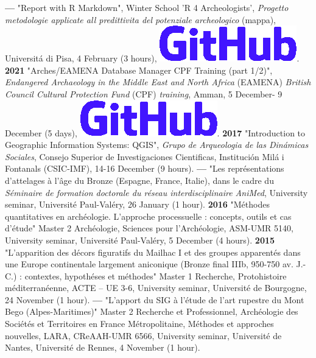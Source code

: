 \documentclass{article}
\begin{document}
\smallbreak
\textbf{--- }"Report with R Markdown", Winter School 'R 4 Archeologists', \textit{Progetto metodologie applicate all predittivita del potenziale archeologico} (mappa), Universit\'{a} di Pisa, 4 February (3 hours), \href{https://github.com/zoometh/thomashuet/tree/main/profiles/oxford/R4A#readme}{\includegraphics[scale=0.12]{github-rect.png}}.
\smallbreak
\textbf{2021 }"Arches/EAMENA Database Manager CPF Training (part 1/2)", \textit{Endangered Archaeology in the Middle East and North Africa} (EAMENA) \textit{British Council Cultural Protection Fund} (CPF) \textit{training}, Amman, 5 December- 9 December (5 days), \href{https://github.com/eamena-oxford/eamena-arches-dev/tree/main/training#readme}{\includegraphics[scale=0.12]{github-rect.png}}.
\smallbreak 
\textbf{2017 }"Introduction to Geographic Information Systems: QGIS", \textit{Grupo de Arqueologia de las Din\'{a}micas Sociales}, Consejo Superior de Investigaciones Cientificas, Instituci\'{o}n Mil\'{a} i Fontanals (CSIC-IMF), 14-16 December (9 hours).
\smallbreak
\textbf{--- }"Les repr\'{e}sentations d'attelages \`{a} l'\^{a}ge du Bronze (Espagne, France, Italie), dans le cadre du \textit{S\'{e}minaire de formation doctorale du r\'{e}seau interdisciplinaire AniMed}, University seminar, Universit\'{e} Paul-Val\'{e}ry, 26 January (1 hour).
\smallbreak
\textbf{2016 }"M\'{e}thodes quantitatives en arch\'{e}ologie. L'approche processuelle : concepts, outils et cas d'\'{e}tude" Master 2 Arch\'{e}ologie, Sciences pour l'Arch\'{e}ologie, ASM-UMR 5140, University seminar, Universit\'{e} Paul-Val\'{e}ry, 5 December (4 hours).
\smallbreak
\textbf{2015 }"L'apparition des d\'{e}cors figuratifs du Mailhac I et des groupes apparent\'{e}s dans une Europe continentale largement aniconique (Bronze final IIIb, 950-750 av. J.-C.) : contextes, hypoth\'{e}ses et m\'{e}thodes" Master 1 Recherche, Protohistoire m\'{e}diterran\'{e}enne, ACTE -- UE 3-6, University seminar, Universit\'{e} de Bourgogne, 24 November (1 hour).
\smallbreak
\textbf{--- }"L'apport du SIG \`{a} l'\'{e}tude de l'art rupestre du Mont Bego (Alpes-Maritimes)" Master 2 Recherche et Professionnel, Arch\'{e}ologie des Soci\'{e}t\'{e}s et Territoires en France M\'{e}tropolitaine, M\'{e}thodes et approches nouvelles, LARA, CReAAH-UMR 6566, University seminar, Universit\'{e} de Nantes, Universit\'{e} de Rennes, 4 November (1 hour).
\end{document}
